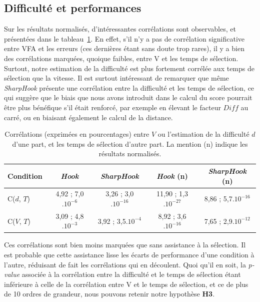 	\subsection{Difficulté et performances}
	Sur les résultats normalisés, d'intéressantes corrélations sont observables, et présentées dans le tableau~\ref{tab:hookCorr}. En effet, s'il n'y a pas de corrélation significative entre VFA et les erreurs (ces dernières étant sans doute trop rares), il y a bien des corrélations marquées, quoique faibles, entre V et les temps de sélection. Surtout, notre estimation de la difficulté est plus fortement corrélée aux temps de sélection que la vitesse. Il est surtout intéressant de remarquer que même \emph{SharpHook} présente une corrélation entre la difficulté et les temps de sélection, ce qui suggère que le biais que nous avons introduit dans le calcul du score pourrait être plus bénéfique s'il était renforcé, par exemple en élevant le facteur $Diff$ au carré, ou en biaisant également le calcul de la distance.
	
	\begin{table}
		\centering
		\begin{tabular}{l | c c c c}
			Condition			& \emph{Hook}				& \emph{SharpHook}			& \emph{Hook} (n)			& \emph{SharpHook} (n)	\bigstrut[b] \\ \hline
			C($d$, $T$)			& 4,92 ; 7,0$.10^{-6}$		& 3,26 ; 3,0$.10^{-16}$		& 11,90 ; 1,3$.10^{-27}$	& 8,86 ; 5,7$.10^{-16}$	\bigstrut[t] \\
			C($V$, $T$)			& 3,09 ; 4,8$.10^{-3}$		& 3,92 ; 3,5$.10^{-4}$		& 8,92 ; 3,6$.10^{-16}$		& 7,65 ; 2,9$.10^{-12}$	\\
		\end{tabular}
		\caption[\emph{Hook} et \emph{SharpHook} -- corrélations]{Corrélations (exprimées en pourcentages) entre $V$ ou l'estimation de la difficulté $d$ d'une part, et les temps de sélection d'autre part. La mention \og (n) \fg{} indique les résultats normalisés.}
		\label{tab:hookCorr}
	\end{table}

	Ces corrélations sont bien moins marquées que sans assistance à la sélection. Il est probable que cette assistance lisse les écarts de performance d'une condition à l'autre, réduisant de fait les corrélations qui en découlent. Quoi qu'il en soit, la \emph{p-value} associée à la corrélation entre la difficulté et le temps de sélection étant inférieure à celle de la corrélation entre V et le temps de sélection, et ce de plus de 10 ordres de grandeur, nous pouvons retenir notre hypothèse \textbf{H3}.
	

